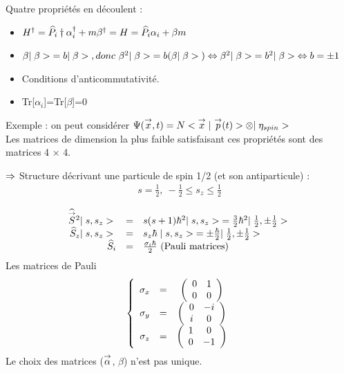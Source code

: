 Quatre propriétés en découlent :

\begin{itemize}[leftmargin=1cm,  itemsep=1pt]
\item $H^\dagger=\widehat{P}_i\dagger\alpha_i^\dagger+m\beta^\dagger
=H=\widehat{P}_i\alpha_i+\beta m$
\item $\beta\ket{\beta}=b\ket{\beta}, donc\ \beta^2\ket{\beta}=
b(\beta\ket{\beta})\ssi\beta^2\ket{\beta}=
b^2\ket{\beta}\ssi b=\pm 1$
\item Conditions d’anticommutativité.
\item Tr[$\alpha_i$]=Tr[$\beta$]=0
\end{itemize}
Exemple : on peut considérer $\Psi({\overset{\rightarrow}{x}},t)=
N<{{\overset{\rightarrow}{x}}}\;|\ {{\overset{\rightarrow}{p}}(t)}>\otimes|\;{\eta_{spin}}>\;$\\

Les matrices de dimension la plus faible satisfaisant ces propriétés sont des
matrices 4 × 4.

$\Rightarrow$ Structure décrivant une particule de spin 1/2 (et son
antiparticule) :
\setlength{\fboxsep}{3pt}
\[
\boxed{
\begin{array}{  c  }
 s=\frac{1}{2},\ -\frac{1}{2}\leqslant s_z\leqslant\frac{1}{2}\\
\end{array}}
\]
\setlength{\fboxsep}{7pt}
\[
\begin{array}{ r c l }
 \widehat{{\overset{\rightarrow}{S}}}{}^2|\;{s,s_z}>\; & = & s(s+1)\hbar^2|\;{s,s_z}>\;=\frac{3}{2}
\hbar^2|\;{\frac{1}{2},\pm\frac{1}{2}}>\; \\
 \widehat{S}_z|\;{s,s_z}>\; & = & s_z\hbar\;|\;{s,s_z}>\;=\pm\frac{\hbar}{2}
|\;{\frac{1}{2},\pm\frac{1}{2}}>\; \\
 \widehat{S}_i & = & \frac{\sigma_i\hbar}{2}\ \text{(Pauli matrices)}\\
\end{array}
\]
Les matrices de Pauli
\[
\left\{
\begin{array}{ c c c }
 \sigma_x&=&\left(\begin{array}{cc}0&1\\0&0\\\end{array}\right)\\
 \sigma_y&=&\left(\begin{array}{cc}0&-i\\i&0\\\end{array}\right)\\
 \sigma_z&=&\left(\begin{array}{cc}1&0\\0&-1\\\end{array}\right)\\
\end{array}
\right .
\]
Le choix des matrices (${\overset{\rightarrow}{\alpha}}$, $\beta$) n’est pas unique.

